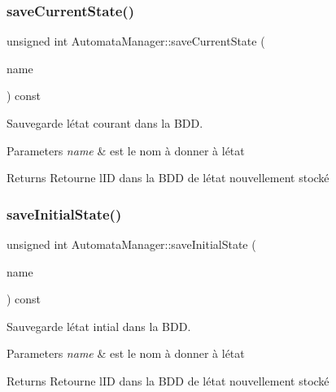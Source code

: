 \subsubsection{\texorpdfstring{save\+Current\+State()}{saveCurrentState()}}
{\footnotesize\ttfamily unsigned int Automata\+Manager\+::save\+Current\+State (\begin{DoxyParamCaption}\item[{Q\+String const \&}]{name }\end{DoxyParamCaption}) const}



Sauvegarde l\textquotesingle{}état courant dans la B\+DD. 


\begin{DoxyParams}{Parameters}
{\em name} & est le nom à donner à l\textquotesingle{}état \\
\hline
\end{DoxyParams}
\begin{DoxyReturn}{Returns}
Retourne l\textquotesingle{}ID dans la B\+DD de l\textquotesingle{}état nouvellement stocké 
\end{DoxyReturn}
\mbox{\label{class_automata_manager_adf2b19b01cf0e63a0037ab13a8fbd428}} 
\subsubsection{\texorpdfstring{save\+Initial\+State()}{saveInitialState()}}
{\footnotesize\ttfamily unsigned int Automata\+Manager\+::save\+Initial\+State (\begin{DoxyParamCaption}\item[{Q\+String const \&}]{name }\end{DoxyParamCaption}) const}



Sauvegarde l\textquotesingle{}état intial dans la B\+DD. 


\begin{DoxyParams}{Parameters}
{\em name} & est le nom à donner à l\textquotesingle{}état \\
\hline
\end{DoxyParams}
\begin{DoxyReturn}{Returns}
Retourne l\textquotesingle{}ID dans la B\+DD de l\textquotesingle{}état nouvellement stocké 
\end{DoxyReturn}
\mbox{\label{class_automata_manager_a36178106743ae4a2df694ba2d37fd7f8}} 
